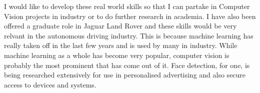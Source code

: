 I would like to develop these real world skills so that I can partake in
Computer Vision projects in industry or to do further research in academia.
I have also been offered a graduate role in Jaguar Land Rover and these skills would be very relvant in the autonomous driving industry.
This is because machine learning has really taken off in the last few years and is
used by many in industry. While machine learning as a whole has become very
popular, computer vision is probably the most prominent that has come out of it.
Face detection, for one, is being researched extensively for use in personalised
advertising and also secure access to devices and systems.
